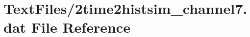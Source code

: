 \hypertarget{2time2histsim__channel7_8dat}{}\section{Text\+Files/2time2histsim\+\_\+channel7.dat File Reference}
\label{2time2histsim__channel7_8dat}
